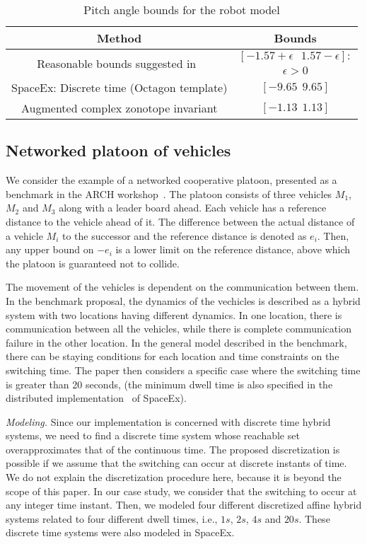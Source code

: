 \begin{table}
\caption{Pitch angle bounds for the robot model}
\centering
\begin{tabular}{|c|c|}
\hline
Method & Bounds\\
\hline
\multirow{2}{9.8em}{Reasonable bounds suggested in~\cite{TODO}} &
$[-1.57+\epsilon~~~1.57-\epsilon]:$\\
& $\epsilon>0$\\
\hline
\multirow{2}{9.8em}{SpaceEx: Discrete time (Octagon template)} &
\multirow{2}{*}{$[-9.65~~9.65]$}\\
& \\
\hline
\multirow{2}{9.8em}{Augmented complex zonotope invariant}
&  \multirow{2}{*}{$[-1.13~~1.13]$}\\
& \\
\hline
\end{tabular}
\end{table}


\subsection{Networked platoon of vehicles}
We consider the example of a networked cooperative platoon, presented
as a benchmark in the ARCH workshop~\cite{TODO}.  The platoon consists
of three vehicles $M_1$, $M_2$ and $M_3$ along with a leader board
ahead.  Each vehicle has a reference distance to the vehicle ahead of
it.  The difference between the actual distance of a vehicle $M_i$ to
the successor and the reference distance is denoted as $e_i$.  Then,
any upper bound on $-e_i$ is a lower limit on the reference
distance, above which the platoon is guaranteed not to collide.

The movement of the vehicles is dependent on the communication between
them.  In the benchmark proposal, the dynamics of the vechicles is
described as a hybrid system with two locations having different
dynamics.  In one location, there is communication between all the
vehicles, while there is complete communication failure in the other
location.  In the general model described in the benchmark, there can
be staying conditions for each location and time constraints on the
switching time.  The paper then considers a specific case where the
switching time is greater than 20 seconds, (the minimum dwell time is
also specified in the distributed implementation~\cite{TODO} of SpaceEx).


\emph{Modeling.}  Since our implementation is concerned with discrete
time hybrid systems, we need to find a discrete time system whose
reachable set overapproximates that of the continuous time.  The
proposed discretization is possible if we assume that the switching
can occur at discrete instants of time.  We do not explain the
discretization procedure here, because it is beyond the scope of this
paper.  In our case study, we consider that the switching to occur at
any integer time instant.  Then, we modeled four different discretized
affine hybrid systems related to four different dwell times, i.e., $1s$,
$2s$, $4s$ and $20s$.  These discrete time systems were also modeled
in SpaceEx.

